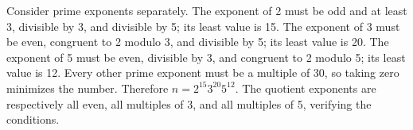 Consider prime exponents separately. The exponent of 2 must be odd and at least 3, divisible by 3, and divisible by 5; its least value is 15. The exponent of 3 must be even, congruent to 2 modulo 3, and divisible by 5; its least value is 20. The exponent of 5 must be even, divisible by 3, and congruent to 2 modulo 5; its least value is 12. Every other prime exponent must be a multiple of 30, so taking zero minimizes the number. Therefore $\boxed{n=2^{15}3^{20}5^{12}}$. The quotient exponents are respectively all even, all multiples of 3, and all multiples of 5, verifying the conditions.
